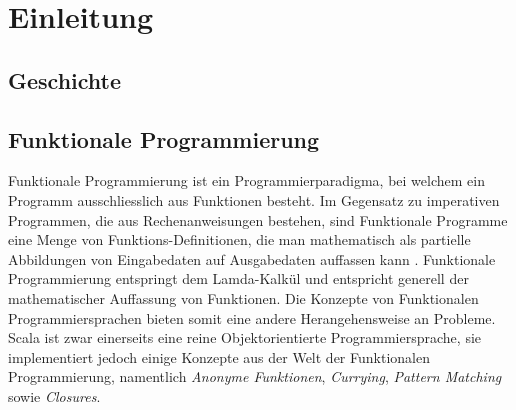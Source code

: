 \chapter{Einleitung}

\section{Geschichte}



\section{Funktionale Programmierung}

Funktionale Programmierung ist ein Programmierparadigma, bei welchem
ein Programm ausschliesslich aus Funktionen besteht. Im Gegensatz
zu imperativen Programmen, die aus Rechenanweisungen bestehen, sind
Funktionale Programme eine Menge von Funktions-Definitionen, die man
mathematisch als partielle Abbildungen von Eingabedaten auf Ausgabedaten
auffassen kann \cite{wikipediaFunktional}. Funktionale Programmierung
entspringt dem Lamda-Kalkül und entspricht generell der mathematischer
Auffassung von Funktionen. Die Konzepte von Funktionalen
Programmiersprachen bieten somit eine andere Herangehensweise an Probleme.\\

Scala ist zwar einerseits eine reine Objektorientierte Programmiersprache,
sie implementiert jedoch einige Konzepte aus der Welt der Funktionalen
Programmierung, namentlich \emph{Anonyme Funktionen}, \emph{Currying},
\emph{Pattern Matching} sowie \emph{Closures}.

